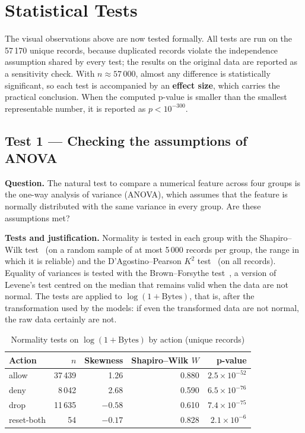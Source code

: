 \section{Statistical Tests}\label{sec:tests}
The visual observations above are now tested formally. All tests are run on the 57\,170 unique records, because duplicated records violate the independence assumption shared by every test; the results on the original data are reported as a sensitivity check. With $n \approx 57\,000$, almost any difference is statistically significant, so each test is accompanied by an \textbf{effect size}, which carries the practical conclusion. When the computed p-value is smaller than the smallest representable number, it is reported as $p < 10^{-300}$.

\subsection{Test 1 --- Checking the assumptions of ANOVA}
\textbf{Question.} The natural test to compare a numerical feature across four groups is the one-way analysis of variance (ANOVA), which assumes that the feature is normally distributed with the same variance in every group. Are these assumptions met?

\textbf{Tests and justification.} Normality is tested in each group with the Shapiro--Wilk test~\cite{shapiro1965analysis} (on a random sample of at most 5\,000 records per group, the range in which it is reliable) and the D'Agostino--Pearson $K^2$ test~\cite{dagostino1973tests} (on all records). Equality of variances is tested with the Brown--Forsythe test~\cite{brown1974robust}, a version of Levene's test centred on the median that remains valid when the data are not normal. The tests are applied to $\log(1+\text{Bytes})$, that is, after the transformation used by the models: if even the transformed data are not normal, the raw data certainly are not.

\begin{table}[htbp]
  \centering
  \caption{Normality tests on $\log(1+\text{Bytes})$ by action (unique records)}
  \label{tab:normality}
  \begin{tabular}{|l|r|r|r|r|}
    \hline
    \textbf{Action} & $n$ & \textbf{Skewness} & \textbf{Shapiro--Wilk $W$} & \textbf{p-value} \\
    \hline
    allow & 37\,439 & 1.26 & 0.880 & $2.5 \times 10^{-52}$ \\
    deny & 8\,042 & 2.68 & 0.590 & $6.5 \times 10^{-76}$ \\
    drop & 11\,635 & $-0.58$ & 0.610 & $7.4 \times 10^{-75}$ \\
    reset-both & 54 & $-0.17$ & 0.828 & $2.1 \times 10^{-6}$ \\
    \hline
  \end{tabular}
\end{table}

